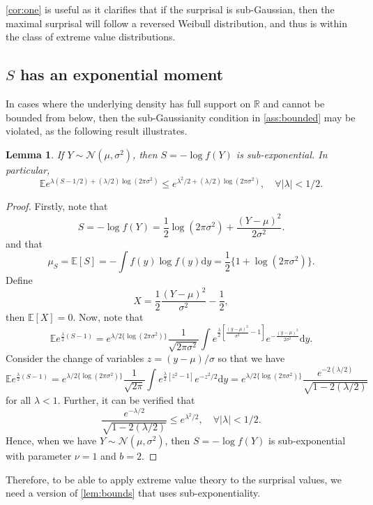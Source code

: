 \documentclass[a4paper,11pt]{article}
\newcommand{\dt}{\mathrm{d}}
\newcommand{\E}{\mathbb{E}}
\newtheorem{lemma}{Lemma}
\begin{document}
\cref{cor:one} is useful as it clarifies that if the surprisal is sub-Gaussian, then the maximal surprisal will follow a reversed Weibull distribution, and thus is within the class of extreme value distributions.

\subsection{$S$ has an exponential moment}

In cases where the underlying density has full support on $\mathbb{R}$ and cannot be bounded from below, then the sub-Gaussianity condition in \cref{ass:bounded} may be violated, as the following result illustrates.

\begin{lemma}
	If $Y\sim \mathcal{N}(\mu,\sigma^2)$, then $S=-\log f(Y)$ is sub-exponential. In particular,
	$$
		\E e^{\lambda(S-1/2)+(\lambda/2)\log(2\pi\sigma^2)}\le e^{\lambda^2/2+(\lambda/2)\log(2\pi\sigma^2)},\quad \forall |\lambda|<1/2.
	$$
\end{lemma}
\begin{proof}
	Firstly, note that
	$$
		S=-\log f(Y)= \frac{1}{2}\log (2\pi\sigma^2)+\frac{(Y-\mu)^2}{2\sigma^2}.
	$$
	and that
	$$
		\mu_S=\E[S]=-\int f(y)\log f(y)\dt y=\frac{1}{2}\{1+\log (2\pi\sigma^2)\}.
	$$ Define
	$$
		X=\frac{1}{2}\frac{(Y-\mu)^2}{\sigma^2}-\frac{1}{2},
	$$
	then $\E[X]=0$. Now, note that
	$$
		\E e^{\frac{\lambda}{2}(S-1)}={e^{\lambda/2\{\log(2\pi\sigma^2)\}}}\frac{1}{\sqrt{2\pi\sigma^2}}\int e^{\frac{\lambda}{2}\left[\frac{(y-\mu)^2}{\sigma^2}-1\right]}e^{-\frac{(y-\mu)^2}{2\sigma^2}}\dt y.
	$$
	Consider the change of variables $z=(y-\mu)/\sigma$ so that we have
	$$
		\E e^{\frac{\lambda}{2}(S-1)}={e^{\lambda/2\{\log(2\pi\sigma^2)\}}}\frac{1}{\sqrt{2\pi}}\int e^{\frac{\lambda}{2}[z^2-1]}e^{-z^2/2}\dt y={e^{\lambda/2\{\log(2\pi\sigma^2)\}}}\frac{e^{-2(\lambda/2)}}{\sqrt{1-2(\lambda/2)}}
	$$for all $\lambda<1$. Further, it can be verified that
	$$
		\frac{e^{-\lambda/2}}{\sqrt{1-2(\lambda/2)}}\le e^{\lambda^2/2},\quad \forall |\lambda|<1/2.
	$$
	Hence, when we have $Y\sim\mathcal{N}(\mu,\sigma^2)$, then $S=-\log f(Y)$ is sub-exponential with parameter $\nu=1$ and $b=2$.
\end{proof}

Therefore, to be able to apply extreme value theory to the surprisal values, we need a version of \cref{lem:bounds} that uses sub-exponentiality.
\end{document}
